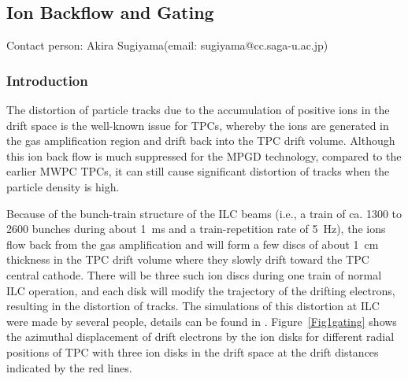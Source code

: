 \subsection{Ion Backflow and Gating}\label{chap:TPC_sec:gating}
Contact person: Akira Sugiyama(email: sugiyama@cc.saga-u.ac.jp)\\



\subsubsection{Introduction}

The distortion of particle tracks due to the accumulation of positive ions in the drift space is the well-known
issue for TPCs, whereby the ions are generated in the gas amplification region and drift back into the TPC drift volume.
Although this ion back flow is much suppressed for the MPGD technology, compared to the earlier MWPC TPCs, it can
still cause significant distortion of tracks when the particle density is high.

Because of the bunch-train structure of the ILC beams (i.e., a  train of ca. 1300 to 2600 bunches during
about \SI{1}{\milli\second}
and a train-repetition rate of \SI{5}{\hertz}), the ions flow back from the gas amplification and will form a few discs
of about \SI{1}{\centi\meter} thickness in the TPC drift volume where they slowly drift toward the TPC central cathode.
There will be three such ion discs during one train of normal ILC operation, and each disk will modify the trajectory
of the drifting electrons, resulting in the distortion of tracks. The simulations of this distortion at ILC
were made by several people, details can be found in \cite{LC-DET-2012-079,Fujii_IonEffects}.
Figure~\ref{Fig1gating} shows the azimuthal displacement of drift electrons by the ion
disks for different radial positions of TPC with three ion disks in the drift space at the drift distances
indicated by the red lines.




